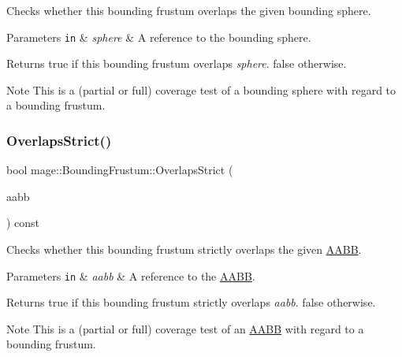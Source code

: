 Checks whether this bounding frustum overlaps the given bounding sphere.


\begin{DoxyParams}[1]{Parameters}
\mbox{\tt in}  & {\em sphere} & A reference to the bounding sphere. \\
\hline
\end{DoxyParams}
\begin{DoxyReturn}{Returns}
{\ttfamily true} if this bounding frustum overlaps {\itshape sphere}. {\ttfamily false} otherwise. 
\end{DoxyReturn}
\begin{DoxyNote}{Note}
This is a (partial or full) coverage test of a bounding sphere with regard to a bounding frustum. 
\end{DoxyNote}
\hypertarget{classmage_1_1_bounding_frustum_af3a6772edd09480a22a175fa4acbfbd8}{}\label{classmage_1_1_bounding_frustum_af3a6772edd09480a22a175fa4acbfbd8} 
\subsubsection{\texorpdfstring{Overlaps\+Strict()}{OverlapsStrict()}\hspace{0.1cm}{\footnotesize\ttfamily [1/2]}}
{\footnotesize\ttfamily bool mage\+::\+Bounding\+Frustum\+::\+Overlaps\+Strict (\begin{DoxyParamCaption}\item[{const \hyperlink{classmage_1_1_a_a_b_b}{A\+A\+BB} \&}]{aabb }\end{DoxyParamCaption}) const\hspace{0.3cm}{\ttfamily [noexcept]}}

Checks whether this bounding frustum strictly overlaps the given \hyperlink{classmage_1_1_a_a_b_b}{A\+A\+BB}.


\begin{DoxyParams}[1]{Parameters}
\mbox{\tt in}  & {\em aabb} & A reference to the \hyperlink{classmage_1_1_a_a_b_b}{A\+A\+BB}. \\
\hline
\end{DoxyParams}
\begin{DoxyReturn}{Returns}
{\ttfamily true} if this bounding frustum strictly overlaps {\itshape aabb}. {\ttfamily false} otherwise. 
\end{DoxyReturn}
\begin{DoxyNote}{Note}
This is a (partial or full) coverage test of an \hyperlink{classmage_1_1_a_a_b_b}{A\+A\+BB} with regard to a bounding frustum. 
\end{DoxyNote}
\hypertarget{classmage_1_1_bounding_frustum_a070075ad4af9935b7b60e7e5345d0aff}{}\label{classmage_1_1_bounding_frustum_a070075ad4af9935b7b60e7e5345d0aff} 

